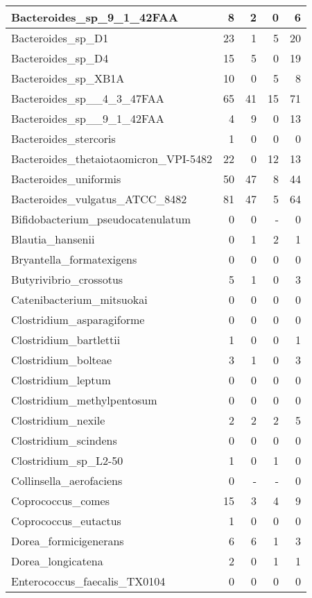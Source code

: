 \documentclass[12pt,a4paper]{article}
\begin{document}
\begin{table}[ht]
\begin{center}
\begin{tabular}{|l*{4}{|r}|}
Bacteroides\_sp\_9\_1\_42FAA & 8 & 2 & 0 & 6 \\ \hline
Bacteroides\_sp\_D1 & 23 & 1 & 5 & 20 \\ \hline
Bacteroides\_sp\_D4 & 15 & 5 & 0 & 19 \\ \hline
Bacteroides\_sp\_XB1A & 10 & 0 & 5 & 8 \\ \hline
Bacteroides\_sp\_\_4\_3\_47FAA & 65 & 41 & 15 & 71 \\ \hline
Bacteroides\_sp\_\_9\_1\_42FAA & 4 & 9 & 0 & 13 \\ \hline
Bacteroides\_stercoris & 1 & 0 & 0 & 0 \\ \hline
Bacteroides\_thetaiotaomicron\_VPI-5482 & 22 & 0 & 12 & 13 \\ \hline
Bacteroides\_uniformis & 50 & 47 & 8 & 44 \\ \hline
Bacteroides\_vulgatus\_ATCC\_8482 & 81 & 47 & 5 & 64 \\ \hline
Bifidobacterium\_pseudocatenulatum & 0 & 0 & - & 0 \\ \hline
Blautia\_hansenii & 0 & 1 & 2 & 1 \\ \hline
Bryantella\_formatexigens & 0 & 0 & 0 & 0 \\ \hline
Butyrivibrio\_crossotus & 5 & 1 & 0 & 3 \\ \hline
Catenibacterium\_mitsuokai & 0 & 0 & 0 & 0 \\ \hline
Clostridium\_asparagiforme & 0 & 0 & 0 & 0 \\ \hline
Clostridium\_bartlettii & 1 & 0 & 0 & 1 \\ \hline
Clostridium\_bolteae & 3 & 1 & 0 & 3 \\ \hline
Clostridium\_leptum & 0 & 0 & 0 & 0 \\ \hline
Clostridium\_methylpentosum & 0 & 0 & 0 & 0 \\ \hline
Clostridium\_nexile & 2 & 2 & 2 & 5 \\ \hline
Clostridium\_scindens & 0 & 0 & 0 & 0 \\ \hline
Clostridium\_sp\_L2-50 & 1 & 0 & 1 & 0 \\ \hline
Collinsella\_aerofaciens & 0 & - & - & 0 \\ \hline
Coprococcus\_comes & 15 & 3 & 4 & 9 \\ \hline
Coprococcus\_eutactus & 1 & 0 & 0 & 0 \\ \hline
Dorea\_formicigenerans & 6 & 6 & 1 & 3 \\ \hline
Dorea\_longicatena & 2 & 0 & 1 & 1 \\ \hline
Enterococcus\_faecalis\_TX0104 & 0 & 0 & 0 & 0 \\ \hline

\end{tabular}
\end{center}
\end{table}
\end{document}
